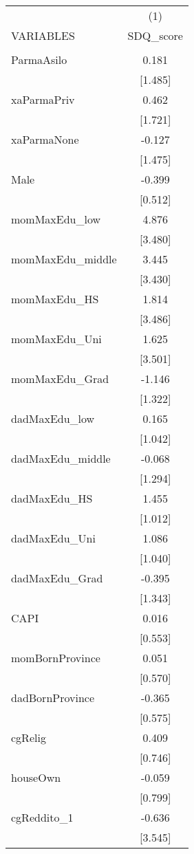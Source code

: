 \documentclass[]{article}
\begin{document}
\begin{tabular}{lc} \hline
 & (1) \\
VARIABLES & SDQ\_score \\ \hline
 &  \\
ParmaAsilo & 0.181 \\
 & [1.485] \\
xaParmaPriv & 0.462 \\
 & [1.721] \\
xaParmaNone & -0.127 \\
 & [1.475] \\
Male & -0.399 \\
 & [0.512] \\
momMaxEdu\_low & 4.876 \\
 & [3.480] \\
momMaxEdu\_middle & 3.445 \\
 & [3.430] \\
momMaxEdu\_HS & 1.814 \\
 & [3.486] \\
momMaxEdu\_Uni & 1.625 \\
 & [3.501] \\
momMaxEdu\_Grad & -1.146 \\
 & [1.322] \\
dadMaxEdu\_low & 0.165 \\
 & [1.042] \\
dadMaxEdu\_middle & -0.068 \\
 & [1.294] \\
dadMaxEdu\_HS & 1.455 \\
 & [1.012] \\
dadMaxEdu\_Uni & 1.086 \\
 & [1.040] \\
dadMaxEdu\_Grad & -0.395 \\
 & [1.343] \\
CAPI & 0.016 \\
 & [0.553] \\
momBornProvince & 0.051 \\
 & [0.570] \\
dadBornProvince & -0.365 \\
 & [0.575] \\
cgRelig & 0.409 \\
 & [0.746] \\
houseOwn & -0.059 \\
 & [0.799] \\
cgReddito\_1 & -0.636 \\
 & [3.545] \\

\end{tabular}
\end{document}
